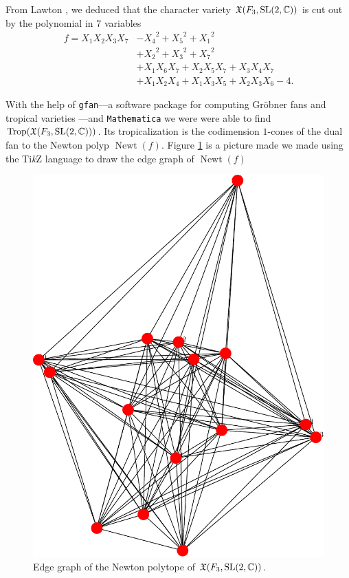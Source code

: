 \documentclass[11pt]{article}
\DeclareMathOperator{\Newt}{Newt}
\begin{document}
From Lawton \cite{}, we deduced that the character variety
$\mathfrak{X}(F_3,\mathrm{SL}(2,\mathbb{C}))$ is cut out by the polynomial in $7$ variables
\begin{equation}
  \label{eq:f3-sl2c}
  \begin{aligned}
    f=X_1X_2X_3X_7&-{X_4}^2+{X_5}^2+{X_1}^2\\
    &+{X_2}^2+{X_3}^2+{X_7}^2\\
    &+X_1X_6X_7+X_2X_5X_7+X_3X_4X_7\\
    &+X_1X_2X_4+X_1X_3X_5+X_2X_3X_6-4.
  \end{aligned}
\end{equation}

With the help of \texttt{gfan}---a software package for computing Gröbner
fans and tropical varieties \cite{gfan}---and \texttt{Mathematica} we were
were able to find $\operatorname{Trop}(\mathfrak{X}(F_3,\mathrm{SL}(2,\mathbb{C})))$. Its tropicalization is
the codimension $1$-cones of the dual fan to the Newton polyp
$\Newt(f)$. Figure \ref{fig:f3-sl2c} is a picture made we made using the
Ti\textit{k}Z language to draw the edge graph of $\Newt(f)$

\begin{figure}[h]
  \centering
  \includegraphics[scale=.25]{smallgraph}
  \caption{Edge graph of the Newton polytope of $\mathfrak{X}(F_3,\mathrm{SL}(2,\mathbb{C}))$.}
\label{fig:f3-sl2c}
\end{figure}



\end{document}
